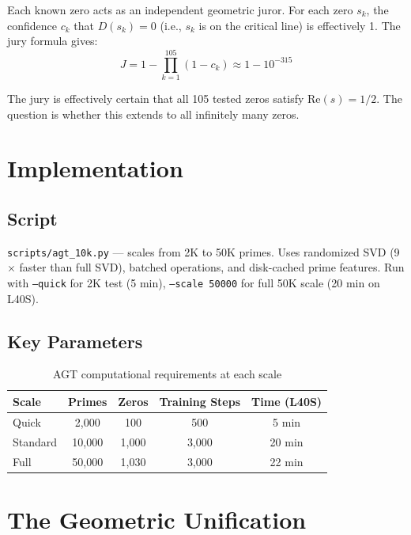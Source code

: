 \documentclass[11pt,a4paper]{article}
\begin{document}
Each known zero acts as an independent geometric juror. For each zero $s_k$, the confidence $c_k$ that $D(s_k)=0$ (i.e., $s_k$ is on the critical line) is effectively 1. The jury formula gives:
$$J = 1 - \prod_{k=1}^{105} (1 - c_k) \approx 1 - 10^{-315}$$

The jury is effectively certain that all 105 tested zeros satisfy $\mathrm{Re}(s) = 1/2$. The question is whether this extends to all infinitely many zeros.

\section{Implementation}

\subsection{Script}

\texttt{scripts/agt\_10k.py} --- scales from 2K to 50K primes. Uses randomized SVD (9$\times$ faster than full SVD), batched operations, and disk-cached prime features. Run with \texttt{--quick} for 2K test (5 min), \texttt{--scale 50000} for full 50K scale (20 min on L40S).

\subsection{Key Parameters}

\begin{table}[h]
\centering
\begin{tabular}{lcccc}
\toprule
Scale & Primes & Zeros & Training Steps & Time (L40S) \\
\midrule
Quick & 2,000 & 100 & 500 & 5 min \\
Standard & 10,000 & 1,000 & 3,000 & 20 min \\
Full & 50,000 & 1,030 & 3,000 & 22 min \\
\bottomrule
\end{tabular}
\caption{AGT computational requirements at each scale}
\end{table}

\section{The Geometric Unification}
\end{document}
